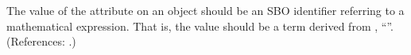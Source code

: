 The value of the attribute  on an \Event object should be
an SBO identifier referring to a mathematical expression.  That is, the
value should be a term derived from \sbointeractionID,
``''.  (References: .)
